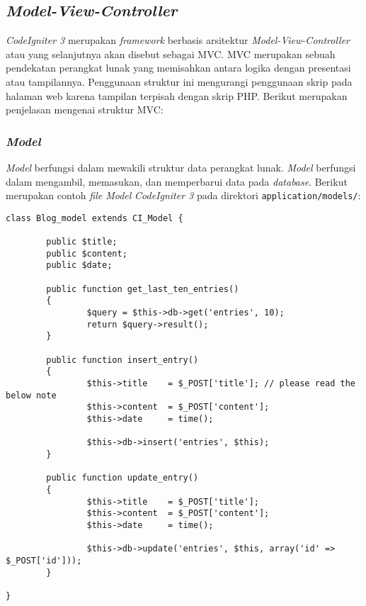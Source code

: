 \subsection{\textit{Model-View-Controller}}
\textit{CodeIgniter 3} merupakan \textit{framework} berbasis arsitektur \textit{Model-View-Controller} atau yang selanjutnya akan disebut sebagai MVC. MVC merupakan sebuah pendekatan perangkat lunak yang memisahkan antara logika dengan presentasi atau tampilannya. Penggunaan struktur ini mengurangi penggunaan skrip pada halaman web karena tampilan terpisah dengan skrip PHP. Berikut merupakan penjelasan mengenai struktur MVC:

\subsubsection{\textit{\textbf{Model}}} \textit{Model} berfungsi dalam mewakili struktur data perangkat lunak. \textit{Model} berfungsi dalam mengambil, memasukan, dan memperbarui data pada \textit{database}. Berikut merupakan contoh \textit{file Model} \textit{CodeIgniter 3} pada direktori \verb|application/models/|:

\begin{lstlisting}[caption=Contoh \textit{model} pada \textit{CodeIgniter 3}, label=kode:model]
class Blog_model extends CI_Model {

        public $title;
        public $content;
        public $date;

        public function get_last_ten_entries()
        {
                $query = $this->db->get('entries', 10);
                return $query->result();
        }

        public function insert_entry()
        {
                $this->title    = $_POST['title']; // please read the below note
                $this->content  = $_POST['content'];
                $this->date     = time();

                $this->db->insert('entries', $this);
        }

        public function update_entry()
        {
                $this->title    = $_POST['title'];
                $this->content  = $_POST['content'];
                $this->date     = time();

                $this->db->update('entries', $this, array('id' => $_POST['id']));
        }

}
\end{lstlisting}

